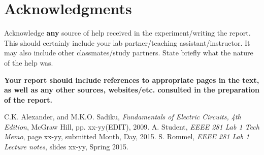 \documentclass[11pt]{article}
\begin{document}
	\section{Acknowledgments}
	Acknowledge \textbf{any} source of help received in the experiment/writing the report.  This should certainly include your lab partner/teaching assistant/instructor.  It may also include other classmates/study partners. State briefly what the nature of the help was.
	
	\textbf{Your report should include references to appropriate pages in the text, as well as any other sources, websites/etc. consulted in the preparation of the report.}
\begin{thebibliography}{9}
	C.K. Alexander, and M.K.O. Sadiku,
	\emph{Fundamentals of Electric Circuits, 4th Edition},
	McGraw Hill, pp. xx-yy(EDIT), 2009.
A. Student,
	\emph{EEEE 281 Lab 1 Tech Memo},
	page xx-yy, submitted Month, Day, 2015.
	S. Rommel,
	\emph{EEEE 281 Lab 1 Lecture notes},
	slides xx-yy, Spring 2015.
\end{thebibliography}
\end{document}
